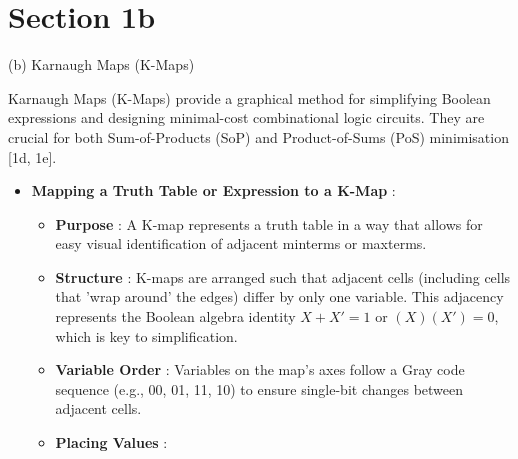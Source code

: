 \documentclass{article}
\begin{document}
\section{Section 1b}

(b) Karnaugh Maps (K-Maps)

Karnaugh Maps (K-Maps) provide a graphical method for simplifying Boolean expressions and designing minimal-cost combinational logic circuits. They are crucial for both Sum-of-Products (SoP) and Product-of-Sums (PoS) minimisation [1d, 1e].

\begin{itemize}
    \item \textbf{Mapping a Truth Table or Expression to a K-Map} :
    \begin{itemize}
        \item \textbf{Purpose} : A K-map represents a truth table in a way that allows for easy visual identification of adjacent minterms or maxterms.
        \item \textbf{Structure} : K-maps are arranged such that adjacent cells (including cells that 'wrap around' the edges) differ by only one variable. This adjacency represents the Boolean algebra identity $X + X' = 1$ or $(X)(X') = 0$, which is key to simplification.
        \item \textbf{Variable Order} : Variables on the map's axes follow a Gray code sequence (e.g., 00, 01, 11, 10) to ensure single-bit changes between adjacent cells.
        \item \textbf{Placing Values} :
    \end{itemize}

\end{itemize}
\end{document}
